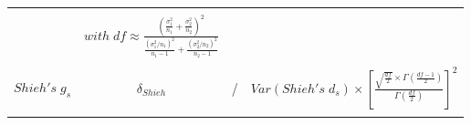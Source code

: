 \documentclass[
  man,floatsintext]{apa6}
\begin{document}
\begin{landscape}
\begin{longtable}[]{@{}lccc@{}}
\begin{minipage}[t]{0.50\columnwidth}
\end{minipage}\tabularnewline
\begin{minipage}[t]{0.04\columnwidth}\raggedright
\strut
\end{minipage} & \begin{minipage}[t]{0.16\columnwidth}\centering
\tiny\(with \; df \approx \frac{\left(\frac{\sigma^2_1}{n_1}+\frac{\sigma^2_2}{n_2} \right)^2}{\frac{(\sigma^2_1/n_1)^2}{n_1-1}+\frac{(\sigma^2_2/n_2)^2}{n_2-1}}\)\strut
\end{minipage} & \begin{minipage}[t]{0.19\columnwidth}\centering
\strut
\end{minipage} & \begin{minipage}[t]{0.50\columnwidth}\centering
\strut
\end{minipage}\tabularnewline
\begin{minipage}[t]{0.04\columnwidth}\raggedright
\strut
\end{minipage} & \begin{minipage}[t]{0.16\columnwidth}\centering
\strut
\end{minipage} & \begin{minipage}[t]{0.19\columnwidth}\centering
\strut
\end{minipage} & \begin{minipage}[t]{0.50\columnwidth}\centering
\strut
\end{minipage}\tabularnewline
\begin{minipage}[t]{0.04\columnwidth}\raggedright
\tiny\(Shieh's \; g_s\)\strut
\end{minipage} & \begin{minipage}[t]{0.16\columnwidth}\centering
\tiny\(\delta_{Shieh}\)\strut
\end{minipage} & \begin{minipage}[t]{0.19\columnwidth}\centering
/\strut
\end{minipage} & \begin{minipage}[t]{0.50\columnwidth}\centering
\tiny\(Var(Shieh's \; d_s) \times \left[\frac{\sqrt{\frac{df}{2}} \times \Gamma(\frac{df-1}{2})}{\Gamma(\frac{df}{2})}\right]^2\)\strut
\end{minipage}\tabularnewline
\begin{minipage}[t]{0.04\columnwidth}\raggedright
\strut
\end{minipage} & \begin{minipage}[t]{0.16\columnwidth}\centering
\strut
\end{minipage} & \begin{minipage}[t]{0.19\columnwidth}\centering

\end{minipage}
\end{longtable}
\end{landscape}
\end{document}
